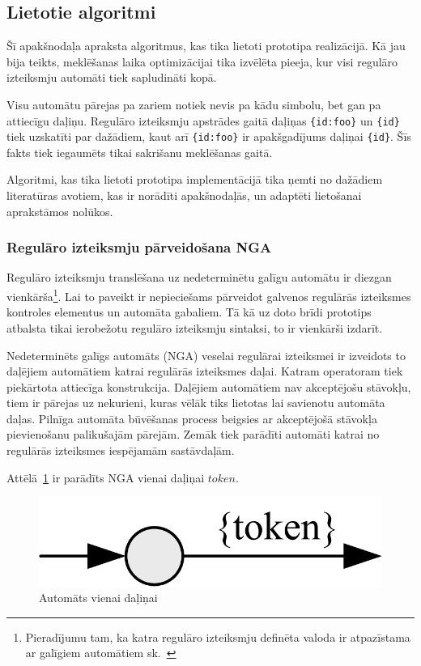 \subsection{\label{sbs:prot_algorithms}Lietotie algoritmi}

Šī apakšnodaļa apraksta algoritmus, kas tika lietoti prototipa realizācijā. Kā jau bija teikts, meklēšanas laika optimizācijai tika izvēlēta pieeja, kur visi regulāro izteiksmju automāti tiek sapludināti kopā.

Visu automātu pārejas pa zariem notiek nevis pa kādu simbolu, bet gan pa attiecīgu daļiņu. Regulāro izteiksmju apstrādes gaitā daļiņas \verb|{id:foo}| un \verb|{id}| tiek uzskatīti par dažādiem, kaut arī \verb|{id:foo}| ir apakšgadījums daļiņai \verb|{id}|. Šīs fakts tiek iegaumēts tikai sakrišanu meklēšanas gaitā.

Algoritmi, kas tika lietoti prototipa implementācijā tika ņemti no dažādiem literatūras avotiem, kas ir norādīti apakšnodaļās, un adaptēti lietošanai aprakstāmos nolūkos.

\subsubsection{Regulāro izteiksmju pārveidošana NGA}

Regulāro izteiksmju translēšana uz nedeterminētu galīgu automātu ir diezgan vienkārša\footnote{Pieradījumu tam, ka katra regulāro izteiksmju definēta valoda ir atpazīstama ar galīgiem automātiem sk.~\cite{RegularExpressionsNFA}}. Lai to paveikt ir nepieciešams  pārveidot galvenos regulārās izteiksmes kontroles elementus un automāta gabaliem. Tā kā uz doto brīdi prototips atbalsta tikai ierobežotu regulāro izteiksmju sintaksi, to ir vienkārši izdarīt.

Nedeterminēts galīgs automāts (NGA) veselai regulārai izteiksmei ir izveidots to daļējiem automātiem katrai regulārās izteiksmes daļai. Katram operatoram tiek piekārtota attiecīga konstrukcija. Daļējiem automātiem nav akceptējošu stāvokļu, tiem ir pārejas uz nekurieni, kuras vēlāk tiks lietotas lai savienotu automāta daļas. Pilnīga automāta būvēšanas process beigsies ar akceptējošā stāvokļa pievienošanu palikušajām pārejām. Zemāk tiek parādīti automāti katrai no regulārās izteiksmes iespējamām sastāvdaļām.

Attēlā~\ref{fig:auto_token} ir parādīts NGA vienai daļiņai ${token}$.
\begin{figure}[H]
  \centering
    \includegraphics[scale=1.5]{pictures/auto_token}
  \caption{\label{fig:auto_token}Automāts vienai daļiņai}
\end{figure}

